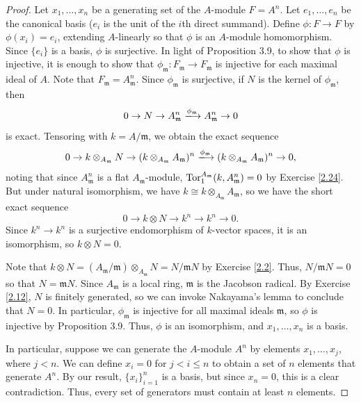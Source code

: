 \begin{proof}
Let $x_1,\ldots,x_n$ be a generating set of the $A$-module $F = A^n$. Let $e_1,\ldots,e_n$ be the canonical basis ($e_i$ is the unit of the $i$th direct summand). Define 
$\phi : F \to F$ by $\phi(x_i) = e_i$, extending $A$-linearly so that $\phi$ is an $A$-module homomorphism. Since $\{e_i\}$ is a basis, $\phi$ is surjective. In light of Proposition 3.9,
to show that $\phi$ is injective, it is enough to show that $\phi_{\mathfrak{m}} : F_{\mathfrak{m}} \to F_{\mathfrak{m}}$ is injective for each maximal ideal of $A$. 
Note that $F_{\mathfrak{m}} = A_{\mathfrak{m}}^n$. Since $\phi_{\mathfrak{m}}$ is surjective, if $N$ is the kernel of $\phi_{\mathfrak{m}}$, then
$$0 \to N \to A_{\mathfrak{m}}^n \xlongrightarrow{\phi_{\mathfrak{m}}} A_{\mathfrak{m}}^n \to 0$$
is exact. Tensoring with $k = A/\mathfrak{m}$, we obtain the exact sequence
$$0 \to k \otimes_{A_{\mathfrak{m}}} N \to (k \otimes_{A_{\mathfrak{m}}} A_{\mathfrak{m}})^n \xlongrightarrow{\phi_{\mathfrak{m}}} (k \otimes_{A_{\mathfrak{m}}} A_{\mathfrak{m}})^n \to 0,$$
noting that since $A_{\mathfrak{m}}^n$ is a flat $A_{\mathfrak{m}}$-module, $\operatorname{Tor}_1^{A_{\mathfrak{m}}}(k,A_{\mathfrak{m}}^n) = 0$ by Exercise \ref{2.24}. But under natural isomorphism,
we have $k \cong k \otimes_{A_{\mathfrak{m}}} A_{\mathfrak{m}}$, so we have the short exact sequence
$$0 \to k \otimes N \to k^n \to k^n \to 0.$$
Since $k^n \to k^n$ is a surjective endomorphism of $k$-vector spaces, it is an isomorphism, so $k \otimes N = 0$.

Note that $k \otimes N = (A_{\mathfrak{m}}/\mathfrak{m})\otimes_{A_{\mathfrak{m}}} N = N/\mathfrak{m}N$ by Exercise \ref{2.2}. Thus,
$N/\mathfrak{m}N = 0$ so that $N = \mathfrak{m}N$. Since $A_{\mathfrak{m}}$ is a local ring, $\mathfrak{m}$ is the Jacobson radical. By Exercise \ref{2.12}, $N$ is finitely generated, 
so we can invoke Nakayama's lemma to conclude that $N = 0$. In particular, $\phi_{\mathfrak{m}}$ is injective for all maximal ideals $\mathfrak{m}$, so $\phi$ is injective by Proposition 3.9.
Thus, $\phi$ is an isomorphism, and $x_1,\ldots,x_n$ is a basis.

In particular, suppose we can generate the $A$-module $A^n$ by elements $x_1,\ldots,x_j$, where $j < n$. We can define $x_i = 0$ for $j < i \le n$ to obtain a set of $n$ elements that generate $A^n$.
By our result, $\{x_i\}_{i=1}^n$ is a basis, but since $x_n = 0$, this is a clear contradiction. Thus, every set of generators must contain at least $n$ elements.
\end{proof}

